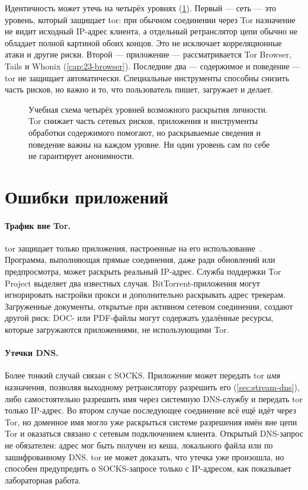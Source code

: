 Идентичность может утечь на четырёх уровнях (\cref{fig:livelli}). Первый — сеть — это уровень, который защищает tor: при обычном соединении через Tor назначение не видит исходный IP-адрес клиента, а отдельный ретранслятор цепи обычно не обладает полной картиной обоих концов. Это не исключает корреляционные атаки и другие риски. Второй — приложение — рассматривается Tor Browser, Tails и Whonix (\cref{cap:23-browser}). Последние два — содержимое и поведение — tor не защищает автоматически. Специальные инструменты способны снизить часть рисков, но важно и то, что пользователь пишет, загружает и делает.

\begin{figure}[htbp]
\centering

\caption{Учебная схема четырёх уровней возможного раскрытия личности. Tor снижает часть сетевых рисков, приложения и инструменты обработки содержимого помогают, но раскрываемые сведения и поведение важны на каждом уровне. Ни один уровень сам по себе не гарантирует анонимности.}
\label{fig:livelli}
\end{figure}

\section{Ошибки приложений}\label{sec:opsec-applicazione}

\paragraph{Трафик вне Tor.} tor защищает только приложения, настроенные на его использование~\cite{torsafety}. Программа, выполняющая прямые соединения, даже ради обновлений или предпросмотра, может раскрыть реальный IP-адрес. Служба поддержки Tor Project выделяет два известных случая. BitTorrent-приложения могут игнорировать настройки прокси и дополнительно раскрывать адрес трекерам. Загруженные документы, открытые при активном сетевом соединении, создают другой риск: DOC- или PDF-файлы могут содержать удалённые ресурсы, которые загружаются приложениями, не использующими Tor.

\paragraph{Утечки DNS.} Более тонкий случай связан с SOCKS. Приложение может передать tor \emph{имя} назначения, позволяя выходному ретранслятору разрешить его (\cref{sec:stream-dns}), либо самостоятельно разрешить имя через системную DNS-службу и передать tor только IP-адрес. Во втором случае последующее соединение всё ещё идёт через Tor, но доменное имя могло уже раскрыться системе разрешения имён вне цепи Tor и оказаться связано с сетевым подключением клиента. Открытый DNS-запрос не обязателен: адрес мог быть получен из кеша, локального файла или по зашифрованному DNS. tor не может доказать, что утечка уже произошла, но способен предупредить о SOCKS-запросе только с IP-адресом, как показывает лабораторная работа.

